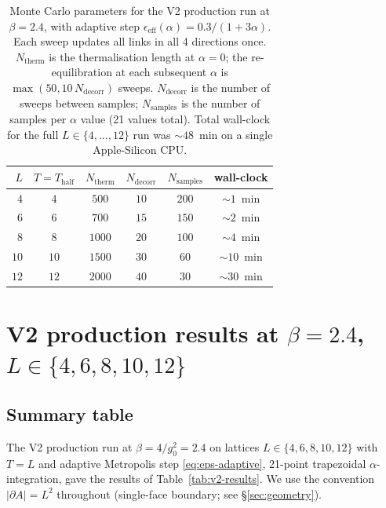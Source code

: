 \documentclass[11pt,a4paper]{article}
\theoremstyle{definition}
\begin{document}
\begin{table}[t]
\centering
\begin{tabular}{rccccc}
\toprule
$L$ & $T = T_{\mathrm{half}}$
    & $N_{\mathrm{therm}}$
    & $N_{\mathrm{decorr}}$
    & $N_{\mathrm{samples}}$
    & wall-clock \\
\midrule
$4$  & $4$  & $500$  & $10$ & $200$ & $\sim 1$~min  \\
$6$  & $6$  & $700$  & $15$ & $150$ & $\sim 2$~min  \\
$8$  & $8$  & $1000$ & $20$ & $100$ & $\sim 4$~min  \\
$10$ & $10$ & $1500$ & $30$ & $60$  & $\sim 10$~min \\
$12$ & $12$ & $2000$ & $40$ & $30$  & $\sim 30$~min \\
\bottomrule
\end{tabular}
\caption{Monte Carlo parameters for the V2 production run at
$\beta = 2.4$, with adaptive step
$\epsilon_{\mathrm{eff}}(\alpha) = 0.3/(1+3\alpha)$.
Each sweep updates all links in all 4 directions once.
$N_{\mathrm{therm}}$ is the thermalisation length at $\alpha = 0$;
the re-equilibration at each subsequent $\alpha$ is
$\max(50, 10\,N_{\mathrm{decorr}})$ sweeps.
$N_{\mathrm{decorr}}$ is the number of sweeps between samples;
$N_{\mathrm{samples}}$ is the number of samples per $\alpha$ value
(21 values total).
Total wall-clock for the full $L \in \{4,...,12\}$ run was
$\sim 48$~min on a single Apple-Silicon CPU.}
\label{tab:v2-params}
\end{table}

\section{V2 production results at \texorpdfstring{$\beta = 2.4$}{beta=2.4}, \texorpdfstring{$L \in \{4,6,8,10,12\}$}{L in {4,6,8,10,12}}}
\label{sec:results}

\subsection{Summary table}
\label{sec:results-summary}

The V2 production run at $\beta = 4/g_0^{2} = 2.4$ on lattices
$L \in \{4,6,8,10,12\}$ with $T = L$ and adaptive Metropolis step
\eqref{eq:eps-adaptive}, 21-point trapezoidal $\alpha$-integration,
gave the results of Table~\ref{tab:v2-results}. We use the
convention $|\partial A| = L^{2}$ throughout (single-face boundary;
see \S\ref{sec:geometry}).
\end{document}
